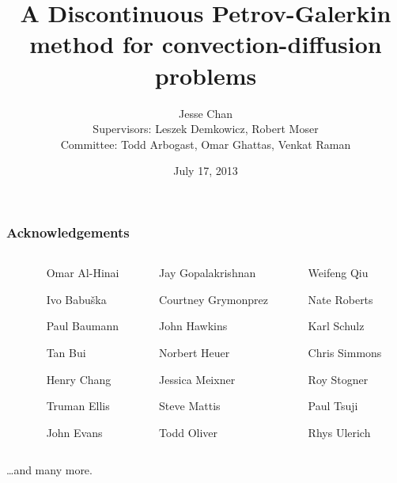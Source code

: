 \documentclass[compress]{beamer}
\institute[ICES]{Institute for Computational Engineering and Sciences}
\title[DPG for convection-diffusion]{A Discontinuous Petrov-Galerkin method for convection-diffusion problems}
\date{July 17, 2013}
\author[J. Chan, L. Demkowicz, R. Moser]{Jesse Chan \\ Supervisors: Leszek Demkowicz, Robert Moser \\ Committee: Todd Arbogast, Omar Ghattas, Venkat Raman}
\begin{document}
\begin{frame}
\maketitle
\end{frame}

\begin{frame}
\frametitle{Acknowledgements}
\begin{columns}[c]
\begin{column}{.03\textwidth}
\end{column}
\begin{column}{.33\textwidth}

Omar Al-Hinai

Ivo Babu\v{s}ka

Paul Baumann

Tan Bui

Henry Chang

Truman Ellis

John Evans

\end{column}
\begin{column}{.33\textwidth}

Jay Gopalakrishnan

Courtney Grymonprez

John Hawkins

Norbert Heuer

Jessica Meixner 

Steve Mattis 

Todd Oliver 

\end{column}
\begin{column}{.33\textwidth}

Weifeng Qiu

Nate Roberts 

Karl Schulz 

Chris Simmons

Roy Stogner

Paul Tsuji

Rhys Ulerich



\end{column}

\end{columns}
\vspace{1cm}
\begin{center}
\ldots and many more.
\end{center}
\end{frame}
\end{document}
